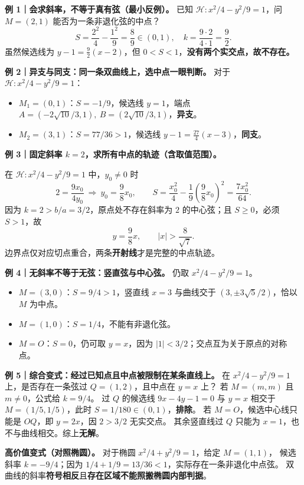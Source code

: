 \clearpage
\begin{examplebox}
\textbf{例 1｜会求斜率，不等于真有弦（最小反例）。}
已知 $\mathcal H:x^2/4-y^2/9=1$，问 $M=(2,1)$ 能否为一条非退化弦的中点？
\[
S=\frac{2^2}{4}-\frac{1^2}{9}=\frac89\in(0,1),
\quad k=\frac{9\cdot 2}{4\cdot 1}=\frac92.
\]
虽然候选线为 $y-1=\frac92(x-2)$，但 $0<S<1$，\textbf{没有两个实交点，故不存在。}
\par\medskip\noindent
\textbf{例 2｜异支与同支：同一条双曲线上，选中点一眼判断。}
对于 $\mathcal H:x^2/4-y^2/9=1$：
\begin{itemize}[leftmargin=2em,topsep=2pt,itemsep=1pt]
\item $M_1=(0,1)$：$S=-1/9$，候选线 $y=1$，端点
$A=(-2\sqrt{10}/3,1),\ B=(2\sqrt{10}/3,1)$，\textbf{异支}。
\item $M_2=(3,1)$：$S=77/36>1$，候选线 $y-1=\frac{27}{4}(x-3)$，\textbf{同支}。
\end{itemize}
\par\medskip\noindent
\end{examplebox}
\clearpage
\begin{examplebox}
\textbf{例 3｜固定斜率 $k=2$，求所有中点的轨迹（含取值范围）。}
\begin{center}\end{center}
在 $\mathcal H:x^2/4-y^2/9=1$ 中，$y_0\ne0$ 时
\[
2=\frac{9x_0}{4y_0}\ \Longrightarrow\ y_0=\frac98x_0,\qquad
S=\frac{x_0^2}{4}-\frac1{9}\left(\frac98x_0\right)^2
=\frac{7x_0^2}{64}.
\]
因为 $k=2>b/a=3/2$，原点处不存在斜率为 $2$ 的中心弦；且 $S\ge0$，必须 $S>1$，故
\[
\boxed{y=\frac98x,\qquad |x|>\frac8{\sqrt7}.}
\]
边界点仅对应切点重合，两条\textbf{开射线}才是完整的中点轨迹。
\par\medskip\noindent
\end{examplebox}
\clearpage
\begin{examplebox}
\textbf{例 4｜无斜率不等于无弦：竖直弦与中心弦。}
仍取 $x^2/4-y^2/9=1$。
\begin{itemize}[leftmargin=2em,topsep=2pt,itemsep=1pt]
\item $M=(3,0)$：$S=9/4>1$，竖直线 $x=3$ 与曲线交于 $(3,\pm 3\sqrt5/2)$，恰以 $M$ 为中点。
\item $M=(1,0)$：$S=1/4$，不能有非退化弦。
\item $M=O$：$S=0$，仍可取 $y=x$，因为 $|1|<3/2$；交点互为关于原点的对称点。
\end{itemize}
\par\medskip\noindent
\textbf{例 5｜综合变式：经过已知点且中点被限制在某条直线上。}
在 $x^2/4-y^2/9=1$ 上，是否存在一条弦过 $Q=(1,2)$，且中点在 $y=x$ 上？
若 $M=(m,m)$ 且 $m\ne0$，公式给 $k=9/4$。
过 $Q$ 的候选线 $9x-4y-1=0$ 与 $y=x$ 相交于
$M=(1/5,1/5)$，此时 $S=1/180\in(0,1)$，\textbf{排除}。
若 $M=O$，候选中心线只能是 $OQ$，即 $y=2x$，因 $2>3/2$ 无实交点。
其余竖直线过 $Q$ 只能为 $x=1$，也不与曲线相交。综上\textbf{无解}。
\par\medskip\noindent
\textbf{高价值变式（对照椭圆）。}
对于椭圆 $x^2/4+y^2/9=1$，给定 $M=(1,1)$，
候选斜率 $k=-9/4$；因为 $1/4+1/9=13/36<1$，实际存在一条非退化中点弦。
双曲线的斜率\textbf{符号相反}且\textbf{存在区域不能照搬椭圆内部判据}。
\end{examplebox}
